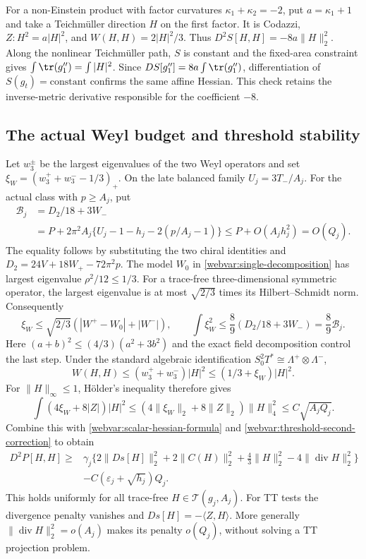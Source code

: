 For a non-Einstein product with factor curvatures
$\kappa_1+\kappa_2=-2$, put $a=\kappa_1+1$ and take a
Teichm\"uller direction $H$ on the first factor.  It is Codazzi,
$Z:H^2=a|H|^2$, and $W(H,H)=2|H|^2/3$.
Thus $D^2S[H,H]=-8a\|H\|_2^2$.
Along the nonlinear Teichm\"uller path, $S$ is constant and the
fixed-area constraint gives
$\int\tr(g_1'')=\int|H|^2$.
Since $DS[g_1'']=8a\int\tr(g_1'')$, differentiation of
$S(g_t)=\mathrm{constant}$ confirms the same affine Hessian.
This check retains the inverse-metric derivative responsible for
the coefficient $-8$.

\subsection{The actual Weyl budget and threshold stability}

Let $w_3^\pm$ be the largest eigenvalues of the two Weyl operators and set
$\xi_W=(w_3^++w_3^--1/3)_+$.  On the late balanced family
$U_j=3T_-/A_j$.  For the actual class with $p\ge A_j$, put
\begin{equation}\label{webvar:weyl-budget}
 \begin{split}
 \mathcal B_j&=D_2/18+3W_-\\
 &=P+2\pi^2A_j\{U_j-1-h_j-2(p/A_j-1)\}
 \le P+O(A_jh_j^2)=O(Q_j).
 \end{split}
\end{equation}
The equality follows by substituting the two chiral identities
and $D_2=24V+18W_+-72\pi^2p$.
The model $W_0$ in \eqref{webvar:single-decomposition} has largest
eigenvalue $\rho^2/12\le1/3$.
For a trace-free three-dimensional symmetric operator, the largest
eigenvalue is at most $\sqrt{2/3}$ times its Hilbert--Schmidt norm.
Consequently
\[
 \xi_W\le\sqrt{2/3}(|W^+-W_0|+|W^-|),\qquad
 \int\xi_W^2\le\frac89(D_2/18+3W_-)=\frac89\mathcal B_j.
\]
Here $(a+b)^2\le(4/3)(a^2+3b^2)$ and the exact field decomposition
control the last step.  Under the standard algebraic identification
$S_0^2T^*\cong\Lambda^+\otimes\Lambda^-$,
\[
 W(H,H)\le(w_3^++w_3^-)|H|^2\le(1/3+\xi_W)|H|^2.
\]
For $\|H\|_\infty\le1$, H\"older's inequality therefore gives
\[
 \int(4\xi_W+8|Z|)|H|^2
 \le(4\|\xi_W\|_2+8\|Z\|_2)\|H\|_4^2
 \le C\sqrt{A_jQ_j}.
\]
Combine this with \eqref{webvar:scalar-hessian-formula} and
\eqref{webvar:threshold-second-correction} to obtain
\begin{equation}\label{webvar:tracefree-threshold-stability}
 \begin{split}
 D^2P[H,H]\ge{}&
 \gamma_j\{2\|Ds[H]\|_2^2+2\|C(H)\|_2^2
                  +\tfrac43\|H\|_2^2-4\|\operatorname{div}H\|_2^2\}\\
 &-C(\varepsilon_j+\sqrt{h_j})Q_j .
 \end{split}
\end{equation}
This holds uniformly for all trace-free $H\in\mathcal T(g_j,A_j)$.
For TT tests the divergence penalty vanishes and $Ds[H]=-\langle Z,H\rangle$.
More generally $\|\operatorname{div}H\|_2^2=o(A_j)$ makes its penalty
$o(Q_j)$, without solving a TT projection problem.


